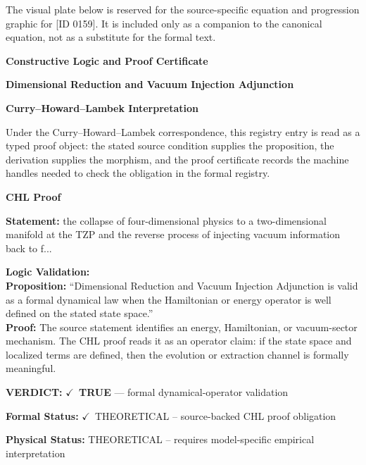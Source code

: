 \begingroup\footnotesize\sloppy
The visual plate below is reserved for the source-specific equation and progression graphic for [ID 0159]. It is included only as a companion to the canonical equation, not as a substitute for the formal text.
\par\endgroup
\ifTZPDarkEdition
{}
\fi

\clearpage
\begingroup\tzpsupportsetup
\noindent\textbf{\fontsize{10.8pt}{12.8pt}\selectfont [ID 0159] Constructive Logic and Proof Certificate}\par
\noindent\textbf{\fontsize{10pt}{12pt}\selectfont Dimensional Reduction and Vacuum Injection Adjunction}\par
\vspace{0.45em}
\begingroup
\footnotesize
\setlength{\parskip}{0.22em}
\setlength{\parindent}{0pt}
\noindent\textbf{Curry--Howard--Lambek Interpretation}\par
Under the Curry--Howard--Lambek correspondence, this registry entry is read as a typed proof
object: the stated source condition supplies the proposition, the derivation supplies the
morphism, and the proof certificate records the machine handles needed to check the obligation
in the formal registry.

\vspace{0.45em}
\noindent\textbf{CHL Proof}\par
\textbf{Statement:} the collapse of four-dimensional physics to a two-dimensional manifold at the TZP and
the reverse process of injecting vacuum information back to f...

\textbf{Logic Validation:}\\
\textbf{Proposition:} ``Dimensional Reduction and Vacuum Injection Adjunction is valid as a formal dynamical law
when the Hamiltonian or energy operator is well defined on the stated state space.''\\
\textbf{Proof:} The source statement identifies an energy, Hamiltonian, or vacuum-sector mechanism. The
CHL proof reads it as an operator claim: if the state space and localized terms are
defined, then the evolution or extraction channel is formally meaningful.

\textbf{VERDICT:} \ensuremath{\checkmark}\ \textbf{TRUE} --- formal dynamical-operator validation

\textbf{Formal Status:} \ensuremath{\checkmark}\ THEORETICAL -- source-backed CHL proof obligation

\textbf{Physical Status:} THEORETICAL -- requires model-specific empirical interpretation
\par\vspace{0.45em}
\par
\ifTZPDarkEdition
{}
\fi
\endgroup
\endgroup
